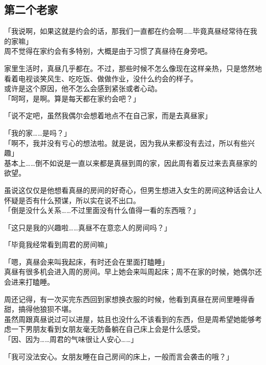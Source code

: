 \subsection{第二个老家}

「我说啊，如果这就是约会的话，那我们一直都在约会啊……毕竟真昼经常待在我的家嘛」\\

周不觉得在家约会有多特别，大概是由于习惯了真昼待在身旁吧。

家里生活时，真昼几乎都在。不过，那些时候不怎么像现在这样亲热，只是悠然地看着电视谈笑风生、吃吃饭、做做作业，没什么约会的样子。\\

或许是这个原因，他不怎么会感到紧张或者心动。\\

「呵呵，是啊。算是每天都在家约会吧？」

「说不定吧，虽然我偶尔会想着地点不在自己家，而是去真昼家」

「我的家……是吗？」\\

「啊不，我并没有亏心的想法啦。就是说，因为我从来都没有去过，所以有些兴趣」\\

基本上……倒不如说是一直以来都是真昼到周的家，因此周有着反过来去真昼家的欲望。

虽说这仅仅是他想看真昼的房间的好奇心，但男生想进入女生的房间这种话会让人怀疑是否有什么预谋，所以实在说不出口。\\

「倒是没什么关系……不过里面没有什么值得一看的东西哦？」

「这只是我的兴趣啦……真昼不在意恋人的房间吗？」

「毕竟我经常看到周君的房间嘛」

「嗯，真昼会来叫我起床，有时还会在里面打瞌睡」\\

真昼有很多机会进入周的房间。早上她会来叫周起床；周不在家的时候，她偶尔还会进来打瞌睡。

周还记得，有一次买完东西回到家想换衣服的时候，他看到真昼在房间里睡得香甜，搞得他狼狈不堪。\\

虽然周跟真昼说过可以进屋，姑且也没什么不该看到的东西，但是周希望她能够考虑一下男朋友看到女朋友毫无防备躺在自己床上会是什么感受。\\

「因、因为……周君的气味很让人安心……」

「我可没法安心。女朋友睡在自己房间的床上，一般而言会袭击的哦？」

